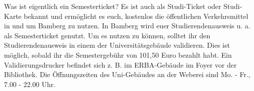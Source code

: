 Was ist eigentlich ein Semesterticket? Es ist auch als Studi-Ticket oder Studi-Karte bekannt und ermöglicht es euch, kostenlos die öffentlichen Verkehrsmittel in und um Bamberg zu nutzen.  In Bamberg wird euer Studierendenausweis u. a. als Semesterticket genutzt. Um es nutzen zu können, solltet ihr den Studierendenausweis in einem der Universitätsgebäude validieren. Dies ist möglich, sobald ihr die Semestergebühr von 101,50 Euro bezahlt habt. Ein Validierungsdrucker befindet sich z. B. im ERBA-Gebäude im Foyer vor der Bibliothek. Die Öffnungszeiten des Uni-Gebäudes an der Weberei sind Mo. - Fr., 7.00 - 22.00 Uhr. 
